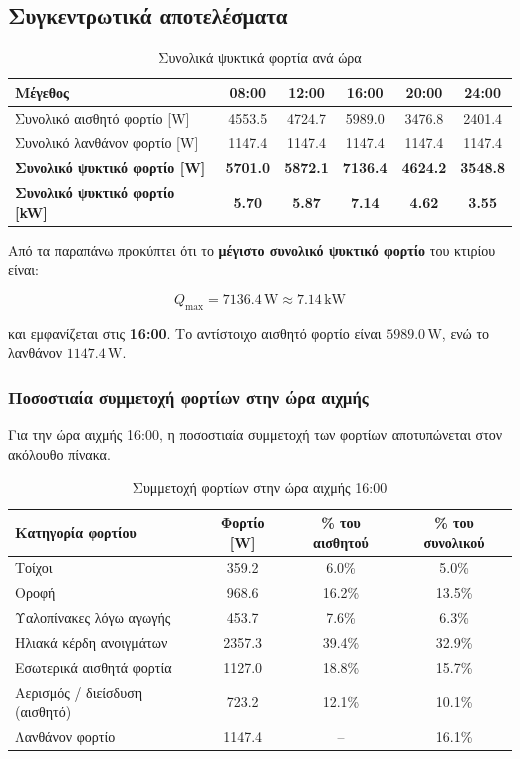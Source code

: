 \documentclass[12pt,a4paper]{article}
\begin{document}
\subsection{Συγκεντρωτικά αποτελέσματα}

\begin{table}[H]
\centering
\caption{Συνολικά ψυκτικά φορτία ανά ώρα}
\begin{tabular}{lccccc}
\toprule
\textbf{Μέγεθος} & \textbf{08:00} & \textbf{12:00} & \textbf{16:00} & \textbf{20:00} & \textbf{24:00} \\
\midrule
Συνολικό αισθητό φορτίο [W] & 4553.5 & 4724.7 & 5989.0 & 3476.8 & 2401.4 \\
Συνολικό λανθάνον φορτίο [W] & 1147.4 & 1147.4 & 1147.4 & 1147.4 & 1147.4 \\
\midrule
\textbf{Συνολικό ψυκτικό φορτίο [W]} & \textbf{5701.0} & \textbf{5872.1} & \textbf{7136.4} & \textbf{4624.2} & \textbf{3548.8} \\
\textbf{Συνολικό ψυκτικό φορτίο [kW]} & \textbf{5.70} & \textbf{5.87} & \textbf{7.14} & \textbf{4.62} & \textbf{3.55} \\
\bottomrule
\end{tabular}
\end{table}

Από τα παραπάνω προκύπτει ότι το \textbf{μέγιστο συνολικό ψυκτικό φορτίο} του κτιρίου
είναι:

\[
Q_{\max} = 7136.4\,\mathrm{W} \approx 7.14\,\mathrm{kW}
\]

και εμφανίζεται στις \textbf{16:00}. Το αντίστοιχο αισθητό φορτίο είναι
\(5989.0\,\mathrm{W}\), ενώ το λανθάνον \(1147.4\,\mathrm{W}\).

\subsubsection{Ποσοστιαία συμμετοχή φορτίων στην ώρα αιχμής}

Για την ώρα αιχμής 16:00, η ποσοστιαία συμμετοχή των φορτίων αποτυπώνεται στον
ακόλουθο πίνακα.

\begin{table}[H]
\centering
\caption{Συμμετοχή φορτίων στην ώρα αιχμής 16:00}
\begin{tabular}{lccc}
\toprule
\textbf{Κατηγορία φορτίου} & \textbf{Φορτίο [W]} & \textbf{\% του αισθητού} & \textbf{\% του συνολικού} \\
\midrule
Τοίχοι & 359.2 & 6.0\% & 5.0\% \\
Οροφή & 968.6 & 16.2\% & 13.5\% \\
Υαλοπίνακες λόγω αγωγής & 453.7 & 7.6\% & 6.3\% \\
Ηλιακά κέρδη ανοιγμάτων & 2357.3 & 39.4\% & 32.9\% \\
Εσωτερικά αισθητά φορτία & 1127.0 & 18.8\% & 15.7\% \\
Αερισμός / διείσδυση (αισθητό) & 723.2 & 12.1\% & 10.1\% \\
Λανθάνον φορτίο & 1147.4 & -- & 16.1\% \\
\bottomrule
\end{tabular}
\end{table}
\end{document}
